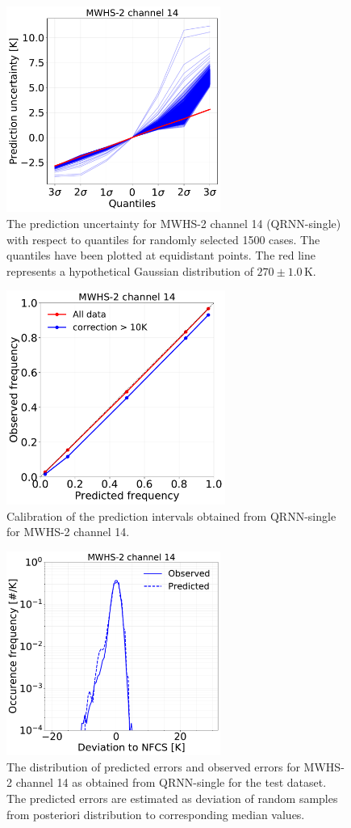 \documentclass[amt, manuscript]{copernicus}
\begin{document}
\begin{figure}[t]
	\includegraphics[width = 70mm]{Figures/prediction_uncertainty_MWHS_14.pdf}	
	\caption{The prediction uncertainty for MWHS-2 channel 14 (QRNN-single) with respect to quantiles for randomly selected 1500 cases. The quantiles have been plotted at equidistant points. The red line represents a hypothetical Gaussian distribution of $270\pm1.0$\,K.}
	\label{fig:prediction_uncertainty_mwhs}	
\end{figure}
\begin{figure}[t]
	\includegraphics[height = 70mm]{Figures/calibration_QRNN_MWHS_14.pdf}	
	\caption{Calibration of the prediction intervals obtained from QRNN-single for MWHS-2 channel 14. }
	\label{fig:calibration_mwhs}	
\end{figure}
\begin{figure}[t]
	\includegraphics[width=70mm]{Figures/deviation_posterior_mwhs_samples_14.pdf}	
	\caption{The distribution of predicted errors and observed errors for MWHS-2 channel 14 as obtained from QRNN-single for the test dataset. The predicted errors are estimated as deviation of random samples from posteriori distribution to corresponding median values.}
	\label{fig:predicted_errors_mwhs}	
\end{figure}
\end{document}
